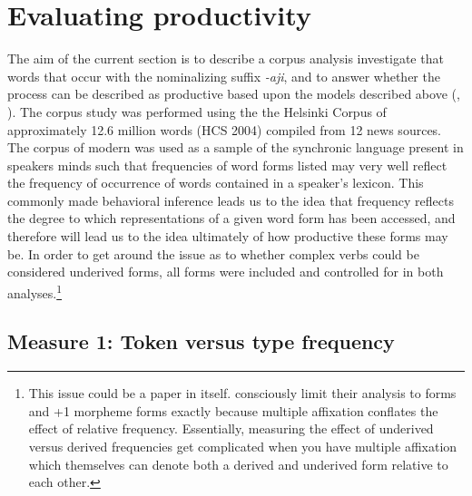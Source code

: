\documentclass[output=paper,modfonts]{langscibook}
\begin{document}
\section{Evaluating productivity}\label{sec:kloehn:2}
\largerpage

The aim of the current section is to describe a corpus analysis investigate that words that occur with the  nominalizing suffix \textit{-aji}, and to answer whether the process can be described as productive based upon the models described above (\citealt{Bybee1995},  \citealt{HayBaayen2002}). The corpus study was performed using the the Helsinki  Corpus of approximately 12.6 million words (HCS 2004) compiled from 12 news sources. The corpus of modern  was used as a sample of the synchronic language present in speakers minds such that frequencies of word forms listed may very well reflect the frequency of occurrence of words contained in a speaker’s lexicon. This commonly made behavioral inference leads us to the idea that frequency reflects the degree to which representations of a given word form has been accessed, and therefore will lead us to the idea ultimately of how productive these forms may be. In order to get around the issue as to whether complex verbs could be considered underived forms, all forms were included and controlled for in both analyses.{}\footnote{This issue could be a paper in itself. \citet{HayBaayen2002} consciously limit their analysis to  forms and +1 morpheme forms exactly because multiple affixation conflates the effect of relative frequency. Essentially, measuring the effect of underived versus derived frequencies get complicated when you have multiple affixation which themselves can denote both a derived and underived form relative to each other.}


\subsection{Measure 1: Token versus type frequency}\label{sec:kloehn:2.1}
\end{document}
